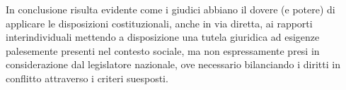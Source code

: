 In conclusione risulta evidente come i giudici abbiano il dovere (e potere) di applicare le disposizioni costituzionali, anche in via diretta, ai rapporti interindividuali mettendo a disposizione una tutela giuridica ad esigenze palesemente presenti nel contesto sociale, ma non espressamente presi in considerazione dal legislatore nazionale, ove necessario bilanciando i diritti in conflitto attraverso i criteri suesposti.

